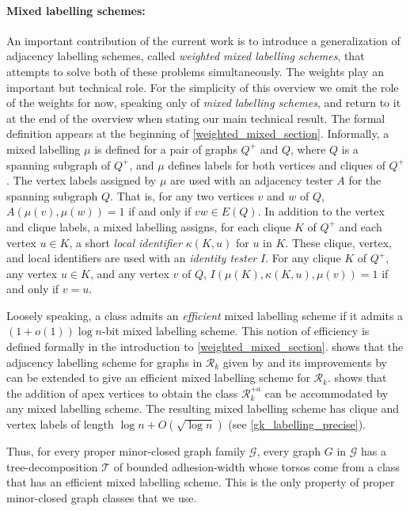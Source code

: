 \documentclass{patmorin}
\newcommand{\defin}[1]{\emph{\textcolor{brightmaroon}{#1}}}
\newcommand{\Oh}{O}
\newcommand{\calG}{\mathcal{G}}
\newcommand{\calR}{\mathcal{R}}
\newcommand{\calT}{\mathcal{T}}
\begin{document}
\paragraph{Mixed labelling schemes:} An important contribution of the current work is to introduce a generalization of adjacency labelling schemes, called \defin{weighted mixed labelling schemes}, that attempts to solve both of these problems simultaneously. The weights play an important but technical role. For the simplicity of this overview we omit the role of the weights for now, speaking only of \emph{mixed labelling schemes}, and return to it at the end of the overview when stating our main technical result. The formal definition appears at the beginning of \cref{weighted_mixed_section}. Informally, a mixed labelling $\mu$ is defined for a pair of graphs $Q^+$ and $Q$, where $Q$ is a spanning subgraph of $Q^+$, and $\mu$ defines labels for both vertices and cliques of $Q^+$. The vertex labels assigned by $\mu$ are used with an adjacency tester $A$ for the spanning subgraph $Q$.  That is, for any two vertices $v$ and $w$ of $Q$, $A(\mu(v),\mu(w)) = 1$ if and only if $vw\in E(Q)$.  In addition to the vertex and clique labels, a mixed labelling assigns, for each clique $K$ of $Q^+$ and each vertex $u\in K$, a short \defin{local identifier} $\kappa(K,u)$ for $u$ in $K$. These clique, vertex, and local identifiers are used with an \defin{identity tester} $I$.  For any clique $K$ of $Q^+$, any vertex $u\in K$, and any vertex $v$ of $Q$, $I(\mu(K),\kappa(K,u),\mu(v))=1$ if and only if $v=u$.

Loosely speaking, a class admits an \emph{efficient} mixed labelling scheme if it admits a $(1+o(1))\log n$-bit mixed labelling scheme. This notion of efficiency is defined formally in the introduction to \cref{weighted_mixed_section}.  shows that the adjacency labelling scheme for graphs in $\calR_k$ given by \citet{dujmovic.esperet.ea:adjacency} and its improvements by \citet{gawrychowski.janczewski:simpler} can be extended to give an efficient mixed labelling scheme for $\calR_k$.   shows that the addition of apex vertices to obtain the class $\calR^{+a}_k$ can be accommodated by any mixed labelling scheme.  The resulting mixed labelling scheme has clique and vertex labels of length $\log n + \Oh(\sqrt{\log n})$ (see \cref{gk_labelling_precise}).

Thus, for every proper minor-closed graph family $\calG$, every graph $G$ in $\calG$ has a tree-decomposition $\calT$ of bounded adhesion-width whose torsos come from a class that has an efficient mixed labelling scheme.  This is the only property of proper minor-closed graph classes that we use.
\end{document}
